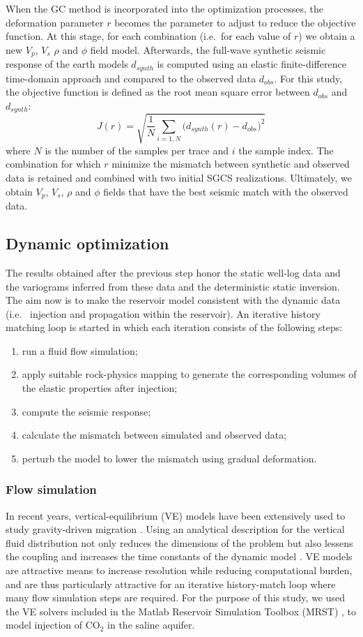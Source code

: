 When the GC method is incorporated into the optimization processes, the
deformation parameter $r$ becomes the parameter to adjust to reduce the
objective function.  At this stage, for each combination (i.e.\ for each value
of $r$) we obtain a new $V_p$, $V_s$ $\rho$ and $\phi$ field model. Afterwards,
the full-wave synthetic seismic response of the earth models $d_{synth}$ is
computed using an elastic finite-difference time-domain approach
\citep{Bohlen2002} and compared to the observed data $d_{obs}$. For this study,
the objective function is defined as the root mean square error between
$d_{obs}$ and $d_{synth}$:
\begin{equation}
J(r) = \sqrt{\frac{1}{N}\sum\limits_{i=1,N}\big(d_{synth}(r)-d_{obs}\big)^2}
\end{equation}
where $N$ is the number of the samples per trace and $i$ the sample index.
The combination for which $r$ minimize the mismatch between synthetic and
observed data is retained and combined with two initial SGCS realizations.
Ultimately, we obtain $V_p$, $V_s$, $\rho$ and $\phi$ fields that have the best
seismic match with the observed data.
\subsection{Dynamic optimization}
The results obtained after the previous step honor the static well-log data and
the variograms inferred from these data and the deterministic static inversion.
The aim now is to make the reservoir model consistent with the dynamic data
(i.e.\  injection and propagation within the reservoir). An iterative
history matching loop is started in which each iteration consists of the
following steps:
\begin{enumerate}
	\item run a fluid flow simulation;
	\item apply suitable rock-physics mapping to generate the corresponding volumes
of the elastic properties after  injection;
	\item compute the seismic response;
	\item calculate the mismatch between simulated and observed data;
	\item perturb the model to lower the mismatch using gradual deformation.
\end{enumerate}
\subsubsection{Flow simulation}
In recent years, vertical-equilibrium (VE) models have been extensively used to
study gravity-driven  migration \citep{Nordbotten2011}. Using an
analytical description for the vertical fluid distribution not only reduces the
dimensions of the problem but also lessens the coupling and increases the time
constants of the dynamic model \citep{Nilsen2014}. VE models are attractive
means to increase resolution while reducing computational burden, and are thus
particularly attractive for an iterative history-match loop where many flow
simulation steps are required. For the purpose of this study, we used the VE
solvers included in the Matlab Reservoir Simulation Toolbox (MRST)
\citep{Lie2012}, to model injection of CO$_2$ in the saline aquifer.
